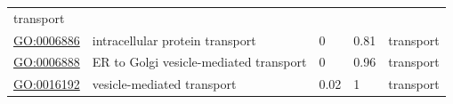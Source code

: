 \documentclass[
]{article}
\begin{document}
\begin{longtable}[]{@{}lllll@{}}
\begin{minipage}[t]{0.17\columnwidth}
transport\strut
\end{minipage}\tabularnewline
\begin{minipage}[t]{0.17\columnwidth}\raggedright
\url{GO:0006886}\strut
\end{minipage} & \begin{minipage}[t]{0.17\columnwidth}\raggedright
intracellular protein transport\strut
\end{minipage} & \begin{minipage}[t]{0.17\columnwidth}\raggedright
0\strut
\end{minipage} & \begin{minipage}[t]{0.17\columnwidth}\raggedright
0.81\strut
\end{minipage} & \begin{minipage}[t]{0.17\columnwidth}\raggedright
transport\strut
\end{minipage}\tabularnewline
\begin{minipage}[t]{0.17\columnwidth}\raggedright
\url{GO:0006888}\strut
\end{minipage} & \begin{minipage}[t]{0.17\columnwidth}\raggedright
ER to Golgi vesicle-mediated transport\strut
\end{minipage} & \begin{minipage}[t]{0.17\columnwidth}\raggedright
0\strut
\end{minipage} & \begin{minipage}[t]{0.17\columnwidth}\raggedright
0.96\strut
\end{minipage} & \begin{minipage}[t]{0.17\columnwidth}\raggedright
transport\strut
\end{minipage}\tabularnewline
\begin{minipage}[t]{0.17\columnwidth}\raggedright
\url{GO:0016192}\strut
\end{minipage} & \begin{minipage}[t]{0.17\columnwidth}\raggedright
vesicle-mediated transport\strut
\end{minipage} & \begin{minipage}[t]{0.17\columnwidth}\raggedright
0.02\strut
\end{minipage} & \begin{minipage}[t]{0.17\columnwidth}\raggedright
1\strut
\end{minipage} & \begin{minipage}[t]{0.17\columnwidth}\raggedright
transport\strut
\end{minipage}\tabularnewline

\end{longtable}
\end{document}
